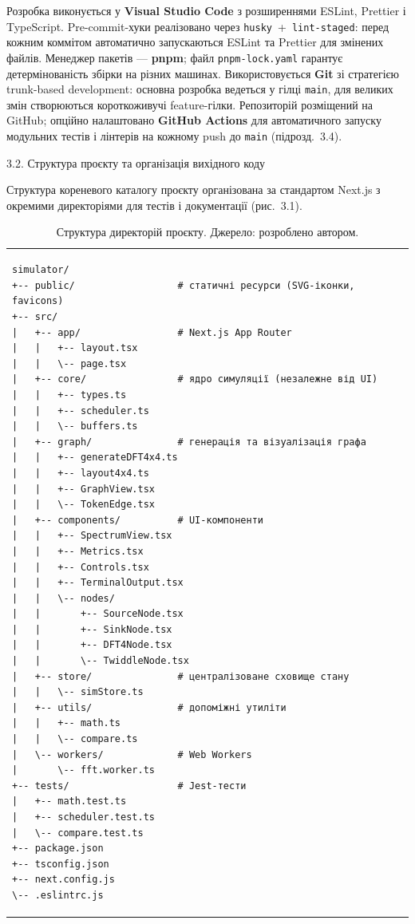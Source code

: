 Розробка виконується у \textbf{Visual Studio Code} з розширеннями
ESLint, Prettier і TypeScript. Pre-commit-хуки реалізовано через
\texttt{husky}~+~\texttt{lint-staged}: перед кожним коммітом автоматично
запускаються ESLint та Prettier для змінених файлів. Менеджер пакетів ---
\textbf{pnpm}; файл \texttt{pnpm-lock.yaml} гарантує детермінованість
збірки на різних машинах. Використовується \textbf{Git} зі стратегією
trunk-based development: основна розробка ведеться у гілці \texttt{main},
для великих змін створюються короткоживучі feature-гілки. Репозиторій
розміщений на GitHub; опційно налаштовано \textbf{GitHub Actions} для
автоматичного запуску модульних тестів і лінтерів на кожному push до
\texttt{main} (підрозд.~3.4).

\protect{}\label{_Toc229681128}{}3.2. Структура проєкту та
організація вихідного коду

Структура кореневого каталогу проєкту організована за стандартом
Next.js з окремими директоріями для тестів і документації (рис.~3.1).

\begin{longtable}[]{@{}
  >{\raggedright\arraybackslash}p{}@{}}
\caption{Структура директорій проєкту. Джерело: розроблено
автором.}\tabularnewline
\toprule\noalign{}
\endfirsthead
\endhead
\bottomrule\noalign{}
\endlastfoot
\begin{minipage}[t]{\linewidth}\raggedright
\begin{verbatim}
simulator/
+-- public/                  # статичні ресурси (SVG-іконки, favicons)
+-- src/
|   +-- app/                 # Next.js App Router
|   |   +-- layout.tsx
|   |   \-- page.tsx
|   +-- core/                # ядро симуляції (незалежне від UI)
|   |   +-- types.ts
|   |   +-- scheduler.ts
|   |   \-- buffers.ts
|   +-- graph/               # генерація та візуалізація графа
|   |   +-- generateDFT4x4.ts
|   |   +-- layout4x4.ts
|   |   +-- GraphView.tsx
|   |   \-- TokenEdge.tsx
|   +-- components/          # UI-компоненти
|   |   +-- SpectrumView.tsx
|   |   +-- Metrics.tsx
|   |   +-- Controls.tsx
|   |   +-- TerminalOutput.tsx
|   |   \-- nodes/
|   |       +-- SourceNode.tsx
|   |       +-- SinkNode.tsx
|   |       +-- DFT4Node.tsx
|   |       \-- TwiddleNode.tsx
|   +-- store/               # централізоване сховище стану
|   |   \-- simStore.ts
|   +-- utils/               # допоміжні утиліти
|   |   +-- math.ts
|   |   \-- compare.ts
|   \-- workers/             # Web Workers
|       \-- fft.worker.ts
+-- tests/                   # Jest-тести
|   +-- math.test.ts
|   +-- scheduler.test.ts
|   \-- compare.test.ts
+-- package.json
+-- tsconfig.json
+-- next.config.js
\-- .eslintrc.js
\end{verbatim}
\end{minipage} \\
\end{longtable}

